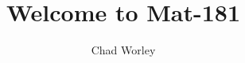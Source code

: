 \documentclass[slidestop,compress,mathserif]{beamer}
\title[Welcome to Mat-181]{Welcome to Mat-181}
\author{Chad Worley}
\institute{Bunker Hill Community College}
\date{}
\begin{document}

{
{
\begin{frame}


\titlepage

\end{frame}
}
}






\end{document}
